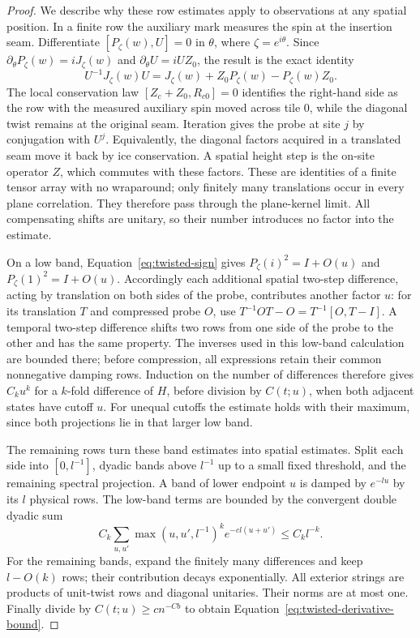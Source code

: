 \begin{proof}
We describe why these row estimates apply to observations at any
spatial position.  In a finite row the auxiliary mark measures the
spin at the insertion seam.  Differentiate
$[P_\zeta(w),U]=0$ in $\theta$, where $\zeta=e^{i\theta}$.
Since $\partial_\theta P_\zeta(w)=iJ_\zeta(w)$ and
$\partial_\theta U=iUZ_0$, the result is the exact identity
\begin{equation}\label{eq:translated-current}
 U^{-1}J_\zeta(w)U
 =J_\zeta(w)+Z_0P_\zeta(w)-P_\zeta(w)Z_0.
\end{equation}
The local conservation law
$[Z_c+Z_0,R_{c0}]=0$ identifies the right-hand side as the row
with the measured auxiliary spin moved across tile $0$, while the
diagonal twist remains at the original seam.  Iteration gives the
probe at site $j$ by conjugation with $U^j$.  Equivalently, the
diagonal factors acquired in a translated seam move it back by ice
conservation.  A spatial height step is the on-site operator $Z$,
which commutes with these factors.  These are identities of a
finite tensor array with no wraparound; only finitely many
translations occur in every plane correlation.  They therefore
pass through the plane-kernel limit.  All compensating shifts are
unitary, so their number introduces no factor into the estimate.

On a low band, Equation~\eqref{eq:twisted-sign} gives
$P_\zeta(i)^2=I+O(u)$ and $P_\zeta(1)^2=I+O(u)$.
Accordingly each additional spatial two-step difference, acting
by translation on both sides of the probe, contributes another
factor $u$: for its translation $T$ and compressed probe $O$, use
$T^{-1}OT-O=T^{-1}[O,T-I]$.  A temporal two-step difference shifts two rows from
one side of the probe to the other and has the same property.
The inverses used in this low-band calculation are bounded there;
before compression, all expressions retain their common
nonnegative damping rows.  Induction on the number of differences
therefore gives $C_k u^k$ for a $k$-fold difference of $H$, before
division by $C(t;u)$, when both adjacent states have cutoff $u$.
For unequal cutoffs the estimate holds with their maximum, since
both projections lie in that larger low band.

The remaining rows turn these band estimates into spatial estimates.
Split each side into $[0,l^{-1}]$, dyadic bands above $l^{-1}$ up
to a small fixed threshold, and the remaining spectral projection.
A band of lower endpoint $u$ is damped by $e^{-lu}$ by its $l$
physical rows.  The low-band terms are bounded by the convergent
double dyadic sum
\[
 C_k\sum_{u,u'}\max(u,u',l^{-1})^k e^{-c l(u+u')}
 \le C_k l^{-k}.
\]
For the remaining bands, expand the finitely many differences and
keep $l-O(k)$ rows; their contribution decays exponentially.
All exterior strings are products of unit-twist rows and diagonal
unitaries.  Their norms are at most one.  Finally divide by
$C(t;u)\ge c n^{-Cb}$ to obtain
Equation~\eqref{eq:twisted-derivative-bound}.
\end{proof}

